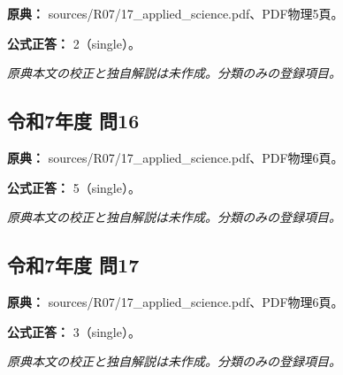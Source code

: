 \noindent\textbf{原典：} sources/R07/17\_applied\_science.pdf、PDF物理5頁。

\textbf{公式正答：} 2（single）。

\par\textit{原典本文の校正と独自解説は未作成。分類のみの登録項目。}

\subsection{令和7年度 問16}
\label{q:r07-reg-applied-16}

\noindent\textbf{原典：} sources/R07/17\_applied\_science.pdf、PDF物理6頁。

\textbf{公式正答：} 5（single）。

\par\textit{原典本文の校正と独自解説は未作成。分類のみの登録項目。}

\subsection{令和7年度 問17}
\label{q:r07-reg-applied-17}

\noindent\textbf{原典：} sources/R07/17\_applied\_science.pdf、PDF物理6頁。

\textbf{公式正答：} 3（single）。

\par\textit{原典本文の校正と独自解説は未作成。分類のみの登録項目。}
